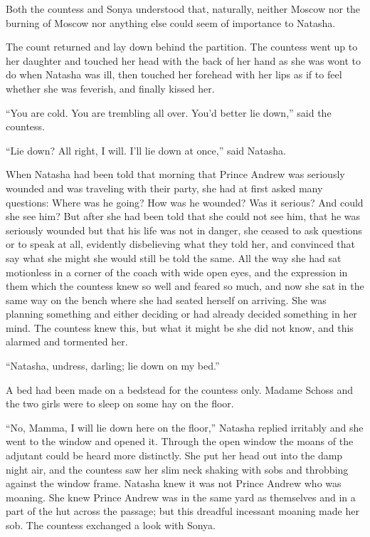 Both the countess and Sonya understood that, naturally, neither
Moscow nor the burning of Moscow nor anything else could seem of
importance to Natasha.

The count returned and lay down behind the partition. The
countess went up to her daughter and touched her head with the
back of her hand as she was wont to do when Natasha was ill, then
touched her forehead with her lips as if to feel whether she was
feverish, and finally kissed her.

``You are cold. You are trembling all over. You'd better lie
down,'' said the countess.

``Lie down? All right, I will. I'll lie down at once,'' said
Natasha.

When Natasha had been told that morning that Prince Andrew was
seriously wounded and was traveling with their party, she had at
first asked many questions: Where was he going? How was he
wounded? Was it serious? And could she see him? But after she had
been told that she could not see him, that he was seriously
wounded but that his life was not in danger, she ceased to ask
questions or to speak at all, evidently disbelieving what they
told her, and convinced that say what she might she would still
be told the same. All the way she had sat motionless in a corner
of the coach with wide open eyes, and the expression in them
which the countess knew so well and feared so much, and now she
sat in the same way on the bench where she had seated herself on
arriving. She was planning something and either deciding or had
already decided something in her mind. The countess knew this,
but what it might be she did not know, and this alarmed and
tormented her.

``Natasha, undress, darling; lie down on my bed.''

A bed had been made on a bedstead for the countess only. Madame
Schoss and the two girls were to sleep on some hay on the floor.

``No, Mamma, I will lie down here on the floor,'' Natasha replied
irritably and she went to the window and opened it. Through the
open window the moans of the adjutant could be heard more
distinctly. She put her head out into the damp night air, and the
countess saw her slim neck shaking with sobs and throbbing
against the window frame. Natasha knew it was not Prince Andrew
who was moaning. She knew Prince Andrew was in the same yard as
themselves and in a part of the hut across the passage; but this
dreadful incessant moaning made her sob. The countess exchanged a
look with Sonya.

